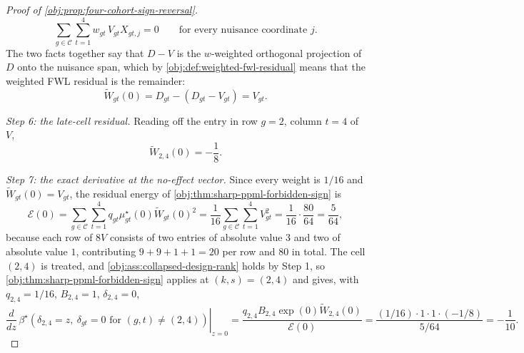 \documentclass[11pt]{article}
\begin{document}
\begin{proof}[Proof of \cref{obj:prop:four-cohort-sign-reversal}]
\[
\sum_{g\in\mathcal C}\sum_{t=1}^4 w_{gt}\,V_{gt}X_{gt,j}=0
\qquad\text{for every nuisance coordinate }j .
\]
The two facts together say that \(D-V\) is the \(w\)-weighted orthogonal projection of \(D\) onto the nuisance span, which by \cref{obj:def:weighted-fwl-residual} means that the weighted FWL residual is the remainder:
\[
\widetilde W_{gt}(0)=D_{gt}-(D_{gt}-V_{gt})=V_{gt}.
\]

\textit{Step 6: the late-cell residual.} Reading off the entry in row \(g=2\), column \(t=4\) of \(V\),
\[
\widetilde W_{2,4}(0)=-\frac18 .
\]

\textit{Step 7: the exact derivative at the no-effect vector.} Since every weight is \(1/16\) and \(\widetilde W_{gt}(0)=V_{gt}\), the residual energy of \cref{obj:thm:sharp-ppml-forbidden-sign} is
\[
\mathcal E(0)
=
\sum_{g\in\mathcal C}\sum_{t=1}^4 q_{gt}\mu^\star_{gt}(0)\widetilde W_{gt}(0)^2
=
\frac{1}{16}\sum_{g\in\mathcal C}\sum_{t=1}^4V_{gt}^2
=
\frac{1}{16}\cdot\frac{80}{64}
=
\frac{5}{64},
\]
because each row of \(8V\) consists of two entries of absolute value \(3\) and two of absolute value \(1\), contributing \(9+9+1+1=20\) per row and \(80\) in total.
The cell \((2,4)\) is treated, and \cref{obj:ass:collapsed-design-rank} holds by Step 1, so \cref{obj:thm:sharp-ppml-forbidden-sign} applies at \((k,s)=(2,4)\) and gives, with \(q_{2,4}=1/16\), \(B_{2,4}=1\), \(\delta_{2,4}=0\),
\[
\left.\frac{d}{dz}\,
\beta^\star\!\left(\delta_{2,4}=z,\ \delta_{gt}=0\text{ for }(g,t)\neq(2,4)\right)
\right|_{z=0}
=
\frac{q_{2,4}B_{2,4}\exp(0)\widetilde W_{2,4}(0)}{\mathcal E(0)}
=
\frac{(1/16)\cdot1\cdot1\cdot(-1/8)}{5/64}
=
-\frac{1}{10}.
\]


\end{proof}
\end{document}
